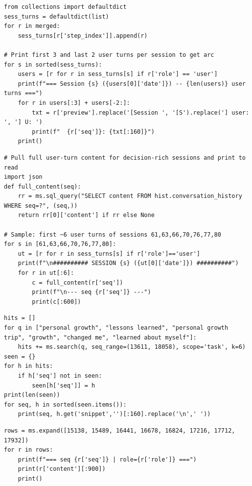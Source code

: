 \begin{lstlisting}[style=scroll, caption={Positional sampling---first 3 and last 2 user turns per session.}, label={lst:sum-c7}]
from collections import defaultdict
sess_turns = defaultdict(list)
for r in merged:
    sess_turns[r['step_index']].append(r)

# Print first 3 and last 2 user turns per session to get arc
for s in sorted(sess_turns):
    users = [r for r in sess_turns[s] if r['role'] == 'user']
    print(f"=== Session {s} ({users[0]['date']}) -- {len(users)} user turns ===")
    for r in users[:3] + users[-2:]:
        txt = r['preview'].replace('[Session ', '[S').replace('] user: ', '] U: ')
        print(f"  {r['seq']}: {txt[:160]}")
    print()
\end{lstlisting}

\begin{lstlisting}[style=scroll, caption={Head-only deep read (first 6 user turns) of sessions 61, 63, 66, 70, 76, 77, 80.}, label={lst:sum-c8}]
# Pull full user-turn content for decision-rich sessions and print to read
import json
def full_content(seq):
    rr = ms.sql_query("SELECT content FROM hist.conversation_history WHERE seq=?", (seq,))
    return rr[0]['content'] if rr else None

# Sample: first ~6 user turns of sessions 61,63,66,70,76,77,80
for s in [61,63,66,70,76,77,80]:
    ut = [r for r in sess_turns[s] if r['role']=='user']
    print(f"\n########## SESSION {s} ({ut[0]['date']}) ##########")
    for r in ut[:6]:
        c = full_content(r['seq'])
        print(f"\n--- seq {r['seq']} ---")
        print(c[:600])
\end{lstlisting}

\begin{lstlisting}[style=scroll, caption={The trajectory's only thematic search---growth vocabulary, bounded to the date range.}, label={lst:sum-c9}]
hits = []
for q in ["personal growth", "lessons learned", "personal growth trip", "growth", "changed me", "learned about myself"]:
    hits += ms.search(q, seq_range=(13611, 18058), scope='task', k=6)
seen = {}
for h in hits:
    if h['seq'] not in seen:
        seen[h['seq']] = h
print(len(seen))
for seq, h in sorted(seen.items()):
    print(seq, h.get('snippet','')[:160].replace('\n',' '))
\end{lstlisting}

\begin{lstlisting}[style=scroll, caption={Verbatim expansion of eight growth-evidence addresses.}, label={lst:sum-c10}]
rows = ms.expand([15138, 15489, 16441, 16678, 16824, 17216, 17712, 17932])
for r in rows:
    print(f"=== seq {r['seq']} | role={r['role']} ===")
    print(r['content'][:900])
    print()
\end{lstlisting}

